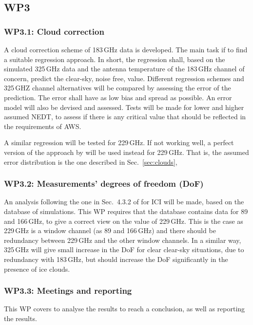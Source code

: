 \documentclass[BCOR=1cm,12pt,bibliography=totoc]{article}
\begin{document}
\subsection*{WP3}
%
\subsubsection*{WP3.1: Cloud correction}
%
A cloud correction scheme of 183\,GHz data is developed. The main task if to
find a suitable regression approach. In short, the regression shall, based on
the simulated 325\,GHz data and the antenna temperature of the 183\,GHz channel
of concern, predict the clear-sky, noise free, value. Different regression
schemes and 325\,GHZ channel alternatives will be compared by assessing the
error of the prediction. The error shall have as low bias and spread as
possible. An error model will also be devised and assessed. Tests will be made
for lower and higher assumed NEDT, to assess if there is any critical value
that should be reflected in the requirements of AWS.

A similar regression will be tested for 229\,GHz. If not working well, a
perfect version of the approach by \citet{rekha2012potential} will be used
instead for 229\,GHz. That is, the assumed error distribution is the one
described in Sec.~\ref{sec:clouds},


\subsubsection*{WP3.2: Measurements’ degrees of freedom (DoF)}
%
An analysis following the one in Sec.~4.3.2 of \citet[][]{eriksson:towar:20}
for ICI will be made, based on the database of simulations. This WP requires
that the database contains data for 89 and 166\,GHz, to give a correct view on
the value of 229\,GHz. This is the case as 229\,GHz is a window channel (as 89
and 166\,GHz) and there should be redundancy between 229\,GHz and the other
window channels. In a similar way, 325\,GHz will give small increase in the DoF
for clear clear-sky situations, due to redundancy with 183\,GHz, but should
increase the DoF significantly in the presence of ice clouds.  


\subsubsection*{WP3.3: Meetings and reporting}
%
This WP covers to analyse the results to reach a conclusion, as well as
reporting the results. 


{\footnotesize
 }
\end{document}
